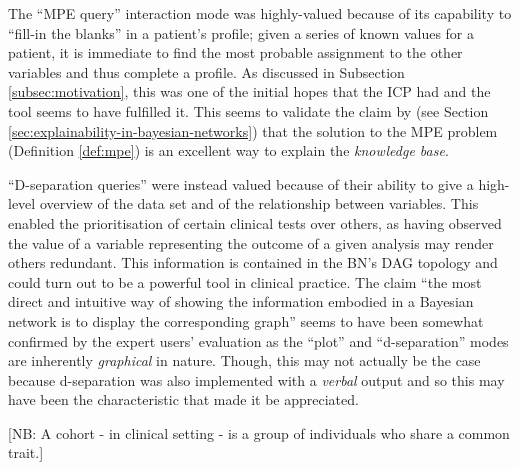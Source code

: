 The \enquote{MPE query} interaction mode was highly-valued because of its capability to \enquote{fill-in the blanks} in a patient's profile; given a series of known values for a patient, it is immediate to find the most probable assignment to the other variables and thus complete a profile.
As discussed in Subsection \ref{subsec:motivation}, this was one of the initial hopes that the ICP had and the tool seems to have fulfilled it.
This seems to validate the claim by \citet{lacave2002review} (see Section \ref{sec:explainability-in-bayesian-networks}) that the solution to the MPE problem (Definition \ref{def:mpe}) is an excellent way to explain the \textit{knowledge base}.

\enquote{D-separation queries} were instead valued because of their ability to give a high-level overview of the data set and of the relationship between variables.
This enabled the prioritisation of certain clinical tests over others, as having observed the value of a variable representing the outcome of a given analysis may render others redundant.
This information is contained in the BN's DAG topology and could turn out to be a powerful tool in clinical practice.
The claim \enquote{the most direct and intuitive way of showing the information embodied in a Bayesian network is to display the corresponding graph} \citep{lacave2002review} seems to have been somewhat confirmed by the expert users' evaluation as the \enquote{plot} and \enquote{d-separation} modes are inherently \textit{graphical} in nature.
Though, this may not actually be the case because d-separation was also implemented with a \textit{verbal} output and so this may have been the characteristic that made it be appreciated.

[NB: A cohort - in clinical setting - is a group of individuals who share a common trait.]

